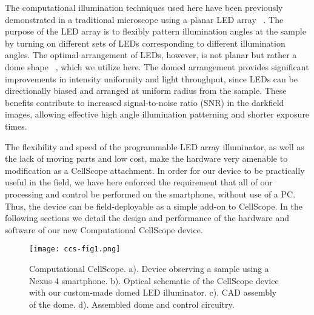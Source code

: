 The computational illumination techniques used here have been previously demonstrated in a traditional microscope using a planar LED array ~\cite{Zheng2011,Zheng2013,Tian14,zijiMulti,tian20153d}. The purpose of the LED array is to flexibly pattern illumination angles at the sample by turning on different sets of LEDs corresponding to different illumination angles. The optimal arrangement of LEDs, however, is not planar but rather a dome shape ~\cite{Dominguez:14}, which we utilize here. The domed arrangement provides significant improvements in intensity uniformity and light throughput, since LEDs can be directionally biased and arranged at uniform radius from the sample. These benefits contribute to increased signal-to-noise ratio (SNR) in the darkfield images, allowing effective high angle illumination patterning and shorter exposure times. 

The flexibility and speed of the programmable LED array illuminator, as well as the lack of moving parts and low cost, make the hardware very amenable to modification as a CellScope attachment. In order for our device to be practically useful in the field, we have here enforced the requirement that all of our processing and control be performed on the smartphone, without use of a PC. Thus, the device can be field-deployable as a simple add-on to CellScope. In the following sections we detail the design and performance of the hardware and software of our new Computational CellScope device.

\begin{figure} [h]
\begin{center}
\texttt{[image: ccs-fig1.png]}
\end{center}
\caption {{Computational CellScope.} {a).} Device observing a sample using a Nexus 4 smartphone. {b).} Optical schematic of the CellScope device with our custom-made domed LED illuminator. {c).} CAD assembly of the dome. {d).} Assembled dome and control circuitry.} 
\label{fig:device} 
\end{figure}

